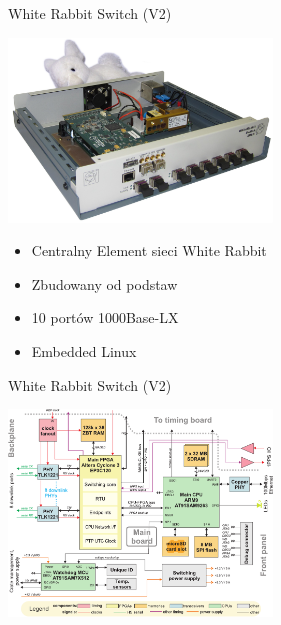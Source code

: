 \documentclass[compress,red]{beamer}
\begin{document}
\begin{frame}{White Rabbit Switch (V2)}

    \begin{center}
    \includegraphics[width=7.0cm]{switch/wrs2_photo.jpg}
    \end{center}

	\begin{itemize}
	\item Centralny Element sieci White Rabbit
	\item Zbudowany od podstaw
	\item 10 portów 1000Base-LX 
	\item Embedded Linux
	\end{itemize}
\end{frame}
\begin{frame}{White Rabbit Switch (V2)}

    \begin{center}
    \includegraphics[width=7.0cm]{switch/wrs2_sw_block.pdf}
    \end{center}


\end{frame}
\end{document}
